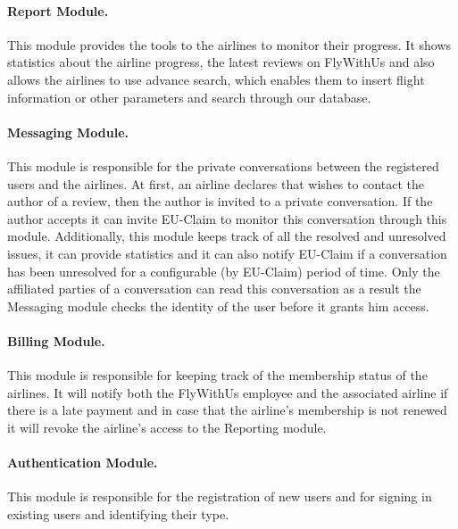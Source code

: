 \paragraph{Report Module.} This module provides the tools to the airlines to monitor their progress. It shows statistics about the airline progress, the latest reviews on FlyWithUs and also allows the airlines to use advance search, which enables them to insert flight information or other parameters and search through our database.

\paragraph{Messaging Module.} This module is responsible for the private conversations between the registered users and the airlines. At first, an airline declares that wishes to contact the author of a review, then the author is invited to a private conversation. If the author accepts it can invite EU-Claim to monitor this conversation through this module. Additionally, this module keeps track of all the resolved and unresolved issues, it can provide statistics and it can also notify EU-Claim if a conversation has been unresolved for a configurable (by EU-Claim) period of time. Only the affiliated parties of a conversation can read this conversation as a result the Messaging module checks the identity of the user before it grants him access.

\paragraph{Billing Module.} This module is responsible for keeping track of the membership status of the airlines. It will notify both the FlyWithUs employee and the associated airline if there is a late payment and in case that the airline's membership is not renewed it will revoke the airline's access to the Reporting module.

\paragraph{Authentication Module.} This module is responsible for the registration of new users and for signing in existing users and identifying their type.
